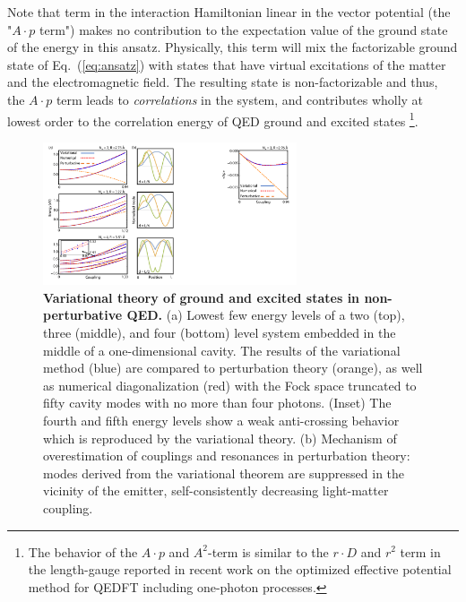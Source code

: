 \documentclass[aps,prl,twocolumn,
	groupedaddress,superscriptaddress,
	amsfonts,amssymb,amsmath,floatfix,
	citeautoscript]{revtex4-1}
\begin{document}
Note that term in the interaction Hamiltonian linear in the vector potential (the "$A\cdot p$ term") makes no contribution to the expectation value of the ground state of the energy in this ansatz.   Physically, this term will mix the factorizable ground state of Eq.~(\ref{eq:ansatz}) with states that  have virtual excitations of the matter and the electromagnetic field. The resulting state is non-factorizable and thus, the $A\cdot p$ term leads to \textit{correlations} in the system, and contributes wholly at lowest order to the correlation energy of QED ground and excited states \footnote{The behavior of the $A\cdot p$ and $A^2$-term is similar to the ${r}\cdot D$ and $r^2$ term in the length-gauge reported in recent work on the optimized effective potential~\cite{pellegrini2015,flick2017c} method for QEDFT including one-photon processes. }.
\begin{figure}[t]
\includegraphics[width=7.5cm]{Figure2and3combined.pdf}
\caption{\textbf{Variational theory of ground and excited states in non-perturbative QED.} (a) Lowest few energy levels of a two (top), three (middle), and four (bottom) level system embedded in the middle of a one-dimensional cavity. The results of the variational method (blue) are compared to perturbation theory (orange), as well as numerical diagonalization (red) with the Fock space truncated to fifty cavity modes with no more than four photons. (Inset) The fourth and fifth energy levels show a weak anti-crossing behavior which is reproduced by the variational theory. (b) Mechanism of overestimation of couplings and resonances in perturbation theory: modes derived from the variational theorem are suppressed in the vicinity of the emitter, self-consistently decreasing light-matter coupling.  }
\label{fig:results}
\end{figure}
\end{document}
